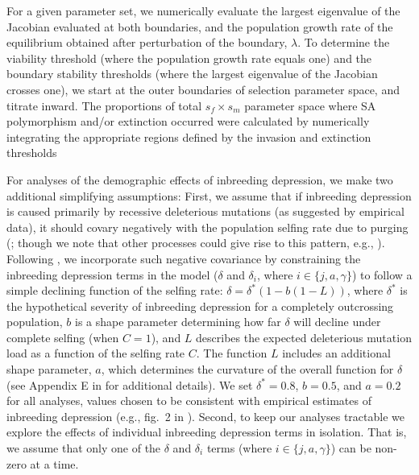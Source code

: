 \documentclass[11pt]{article}
\begin{document}
For a given parameter set, we numerically evaluate the largest eigenvalue of the Jacobian evaluated at both boundaries, and the population growth rate of the equilibrium obtained after perturbation of the boundary, $\lambda$. To determine the viability threshold (where the population growth rate equals one) and the boundary stability thresholds (where the largest eigenvalue of the Jacobian crosses one), we start at the outer boundaries of selection parameter space, and titrate inward. The proportions of total $s_f \times s_m$ parameter space where SA polymorphism and/or extinction occurred were calculated by numerically integrating the appropriate regions defined by the invasion and extinction thresholds

For analyses of the demographic effects of inbreeding depression, we make two additional simplifying assumptions: First, we assume that if inbreeding depression is caused primarily by recessive deleterious mutations (as suggested by empirical data), it should covary negatively with the population selfing rate due to purging (\citealt{Charlesworth2009}; though we note that other processes could give rise to this pattern, e.g., \citealt{CrnokrakBarrett2002, Charlesworth2009,HedrickGarcia-Dorado2016}). Following \citet{Olito2019}, we incorporate such negative covariance by constraining the inbreeding depression terms in the model ($\delta$ and $\delta_i$, where $i \in \{j,a,\gamma\}$) to follow a simple declining function of the selfing rate: $\delta = \delta^{\ast} (1 - b (1 - L))$, where $\delta^{\ast}$ is the hypothetical severity of inbreeding depression for a completely outcrossing population, $b$ is a shape parameter determining how far $\delta$ will decline under complete selfing (when $C = 1$), and $L$ describes the expected deleterious mutation load as a function of the selfing rate $C$. The function $L$ includes an additional shape parameter, $a$, which determines the curvature of the overall function for $\delta$ (see Appendix E in \citealt{Olito2019} for additional details). We set $\delta^{\ast} = 0.8$, $b = 0.5$, and $a = 0.2$ for all analyses, values chosen to be consistent with empirical estimates of inbreeding depression (e.g., fig.~2 in \citealt{HusbandSchemske1996}). Second, to keep our analyses tractable we explore the effects of individual inbreeding depression terms in isolation. That is, we assume that only one of the $\delta$ and $\delta_i$ terms (where $i \in \{j,a,\gamma\}$) can be non-zero at a time.




\end{document}
